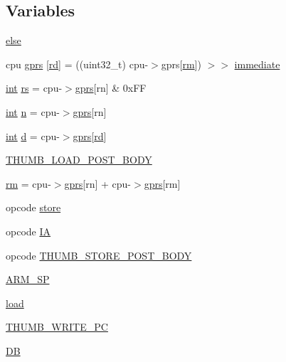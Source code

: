 \subsection*{Variables}
\begin{DoxyCompactItemize}
\item 
\mbox{\hyperlink{isa-thumb_8c_a0544c3fe466e421738dae463968b70ba}{else}}
\item 
cpu \mbox{\hyperlink{isa-thumb_8c_a6b4b7e13a9a144391615b217c5917bc7}{gprs}} \mbox{[}\mbox{\hyperlink{isa-arm_8c_a555541ce18ed9b5fad657a06b22cb465}{rd}}\mbox{]} = ((uint32\+\_\+t) cpu-\/$>$gprs\mbox{[}\mbox{\hyperlink{isa-thumb_8c_a20e40d2fb8c51fa4dd2b4449ad32e111}{rm}}\mbox{]}) $>$$>$ \mbox{\hyperlink{lr35902_2decoder_8c_a8bc2501cb64b3bc9ac59754cfafb68d1}{immediate}}
\item 
\mbox{\hyperlink{ioapi_8h_a787fa3cf048117ba7123753c1e74fcd6}{int}} \mbox{\hyperlink{isa-thumb_8c_a03b78d51ad860bbea2f9c98276d0b70b}{rs}} = cpu-\/$>$\mbox{\hyperlink{isa-thumb_8c_a6b4b7e13a9a144391615b217c5917bc7}{gprs}}\mbox{[}rn\mbox{]} \& 0x\+FF
\item 
\mbox{\hyperlink{ioapi_8h_a787fa3cf048117ba7123753c1e74fcd6}{int}} \mbox{\hyperlink{isa-thumb_8c_a76f11d9a0a47b94f72c2d0e77fb32240}{n}} = cpu-\/$>$\mbox{\hyperlink{isa-thumb_8c_a6b4b7e13a9a144391615b217c5917bc7}{gprs}}\mbox{[}rn\mbox{]}
\item 
\mbox{\hyperlink{ioapi_8h_a787fa3cf048117ba7123753c1e74fcd6}{int}} \mbox{\hyperlink{isa-thumb_8c_a6f364afbe132c4ecfea48bde1b0618ba}{d}} = cpu-\/$>$\mbox{\hyperlink{isa-thumb_8c_a6b4b7e13a9a144391615b217c5917bc7}{gprs}}\mbox{[}\mbox{\hyperlink{isa-arm_8c_a555541ce18ed9b5fad657a06b22cb465}{rd}}\mbox{]}
\item 
\mbox{\hyperlink{isa-thumb_8c_a9438645a9cdcda0203c3769a4658e9b1}{T\+H\+U\+M\+B\+\_\+\+L\+O\+A\+D\+\_\+\+P\+O\+S\+T\+\_\+\+B\+O\+DY}}
\item 
\mbox{\hyperlink{isa-thumb_8c_a20e40d2fb8c51fa4dd2b4449ad32e111}{rm}} = cpu-\/$>$\mbox{\hyperlink{isa-thumb_8c_a6b4b7e13a9a144391615b217c5917bc7}{gprs}}\mbox{[}rn\mbox{]} + cpu-\/$>$\mbox{\hyperlink{isa-thumb_8c_a6b4b7e13a9a144391615b217c5917bc7}{gprs}}\mbox{[}rm\mbox{]}
\item 
opcode \mbox{\hyperlink{isa-thumb_8c_aa7072e7bfc5f1cdeadec25ecc3c246bf}{store}}
\item 
opcode \mbox{\hyperlink{isa-thumb_8c_a3048b70ae3e6d982e60f063bd78fda51}{IA}}
\item 
opcode \mbox{\hyperlink{isa-thumb_8c_ae88bfe80e1c8ddde6046679bb6068a90}{T\+H\+U\+M\+B\+\_\+\+S\+T\+O\+R\+E\+\_\+\+P\+O\+S\+T\+\_\+\+B\+O\+DY}}
\item 
\mbox{\hyperlink{isa-thumb_8c_acce42da2f3c8524d613be6906db2e0c9}{A\+R\+M\+\_\+\+SP}}
\item 
\mbox{\hyperlink{isa-thumb_8c_adaadec1ef48bb32b80ea5572e7d12ca6}{load}}
\item 
\mbox{\hyperlink{isa-thumb_8c_a94ae991d0d338d43766e37c259589656}{T\+H\+U\+M\+B\+\_\+\+W\+R\+I\+T\+E\+\_\+\+PC}}
\item 
\mbox{\hyperlink{isa-thumb_8c_ad4dd2bbef91d8d1a17ca7b9ad41203cd}{DB}}
\end{DoxyCompactItemize}


